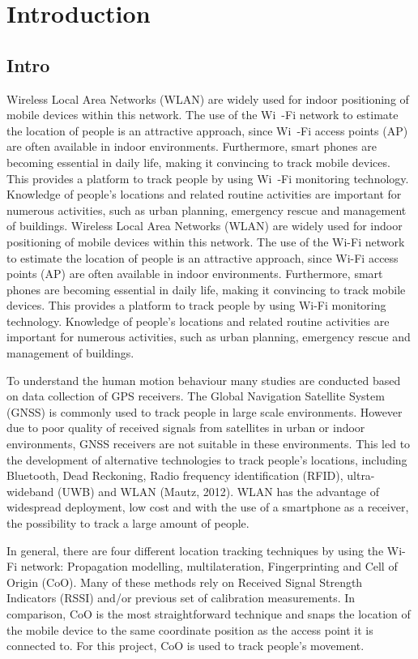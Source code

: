 \chapter{Introduction}\label{Introduction}
\section{Intro}\label{intro}
Wireless Local Area Networks (WLAN) are widely used for indoor positioning of mobile devices within this network. The use of the Wi\ -Fi network to estimate the location of people is an attractive approach, since Wi\ -Fi access points (AP) are often available in indoor environments. Furthermore, smart phones are becoming essential in daily life, making it convincing to track mobile devices. This provides a platform to track people by using Wi\ -Fi monitoring technology. Knowledge of people’s locations and related routine activities are important for numerous activities, such as urban planning, emergency rescue and management of buildings.
Wireless Local Area Networks (WLAN) are widely used for indoor positioning of mobile devices within this network. The use of the Wi-Fi network to estimate the location of people is an attractive approach, since Wi-Fi access points (AP) are often available in indoor environments. Furthermore, smart phones are becoming essential in daily life, making it convincing to track mobile devices. This provides a platform to track people by using Wi-Fi monitoring technology. Knowledge of people’s locations and related routine activities are important for numerous activities, such as urban planning, emergency rescue and management of buildings.

To understand the human motion behaviour many studies are conducted based on data collection of GPS receivers. The Global Navigation Satellite System (GNSS) is commonly used to track people in large scale environments. However due to poor quality of received signals from satellites in urban or indoor environments, GNSS receivers are not suitable in these environments. This led to the development of alternative technologies to track people’s locations, including Bluetooth, Dead Reckoning, Radio frequency identification (RFID), ultra-wideband (UWB) and WLAN (Mautz, 2012). WLAN has the advantage of widespread deployment, low cost and with the use of a smartphone as a receiver, the possibility to track a large amount of people.  

In general, there are four different location tracking techniques by using the Wi-Fi network: Propagation modelling, multilateration, Fingerprinting and Cell of Origin (CoO). Many of these methods rely on Received Signal Strength Indicators (RSSI) and/or previous set of calibration measurements. In comparison, CoO is the most straightforward technique and snaps the location of the mobile device to the same coordinate position as the access point it is connected to. For this project, CoO is used to track people’s movement.

